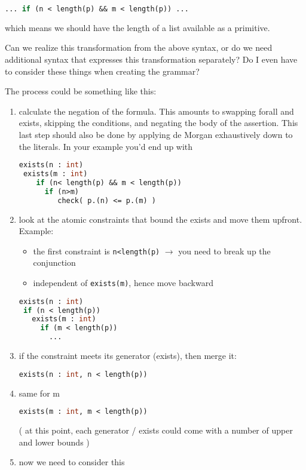 \documentclass{article}
\begin{document}
\begin{lstlisting}[language=Caml]
... if (n < length(p) && m < length(p)) ...
\end{lstlisting}
which means we should have the length of a list available as a primitive.


Can we realize this transformation from the above syntax, or do we
need additional syntax that expresses this transformation separately? 
Do I even have to consider these things when creating the grammar?

The process could be something like this:
\begin{enumerate}
\item  calculate the negation of the formula. This amounts to
  swapping forall and exists, skipping the conditions, and negating
  the body of the assertion. This last step should also be done by
  applying de Morgan exhaustively down to the literals. In your
  example you'd end up with

\begin{lstlisting}[language=Caml]
exists(n : int)
 exists(m : int)
    if (n< length(p) && m < length(p))
      if (n>m)
         check( p.(n) <= p.(m) )
\end{lstlisting}
\item look at the atomic constraints that bound the exists and move them upfront. Example: 
  \begin{itemize}
  \item  the first constraint is \lstinline/n<length(p)/ $\to$ you need to break up
    the conjunction
  \item independent of \lstinline/exists(m)/, hence move backward
  \end{itemize}
\begin{lstlisting}[language=Caml]
exists(n : int)
 if (n < length(p))
   exists(m : int)
     if (m < length(p))
       ...
\end{lstlisting}
\item  if the constraint meets its generator (exists), then merge it:

\begin{lstlisting}[language=Caml]
exists(n : int, n < length(p))
\end{lstlisting}
\item  same for m

\begin{lstlisting}[language=Caml]
 exists(m : int, m < length(p))
\end{lstlisting}
( at this point, each generator / exists could come with a number of upper and lower bounds )
\item now we need to consider this


\end{enumerate}
\end{document}
